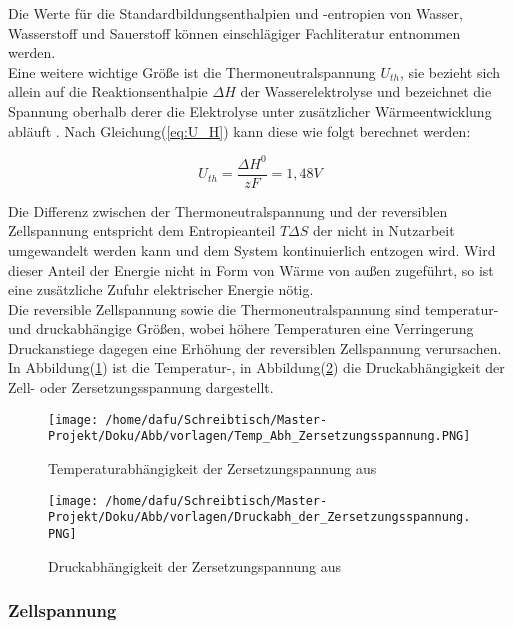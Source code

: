 \documentclass[onecolumn,10pt,titlepage]{article}
\begin{document}
	Die Werte für die Standardbildungsenthalpien und -entropien von Wasser, Wasserstoff und Sauerstoff können einschlägiger Fachliteratur entnommen werden.\\
	Eine weitere wichtige Größe ist die Thermoneutralspannung $U_{th}$, sie bezieht sich allein auf die Reaktionsenthalpie $\Delta H$ der Wasserelektrolyse und bezeichnet die Spannung oberhalb derer die Elektrolyse unter zusätzlicher Wärmeentwicklung abläuft \cite{Kurzweil.2015}. Nach Gleichung(\ref{eq:U_H}) kann diese wie folgt berechnet werden:
	
	\begin{equation}
	U_{th} = \frac{\Delta H^0}{zF} = 1,48 V
	\label{eq:U_H}
	\end{equation}
	
	Die Differenz zwischen der Thermoneutralspannung und der reversiblen Zellspannung entspricht dem Entropieanteil $T\Delta S$ der nicht in Nutzarbeit umgewandelt werden kann und dem System kontinuierlich entzogen wird. Wird dieser Anteil der Energie nicht in Form von Wärme von außen zugeführt, so ist eine zusätzliche Zufuhr elektrischer Energie nötig.\\
	Die reversible Zellspannung sowie die Thermoneutralspannung sind temperatur- und druckabhängige Größen, wobei höhere Temperaturen eine Verringerung Druckanstiege dagegen eine Erhöhung der reversiblen Zellspannung verursachen. In Abbildung(\ref{fig:Temperatur_U0}) ist die Temperatur-, in Abbildung(\ref{fig:Druck_U0}) die Druckabhängigkeit der Zell- oder Zersetzungsspannung dargestellt.\cite{Kurzweil.2015}
	
	\begin{figure}[H]
		\centering
		\texttt{[image: /home/dafu/Schreibtisch/Master-Projekt/Doku/Abb/vorlagen/Temp\_Abh\_Zersetzungsspannung.PNG]}
		\caption[Temperaturabhängigkeit der Zersetzungspannung]{Temperaturabhängigkeit der Zersetzungspannung aus \cite{Kurzweil.2015}}
		\label{fig:Temperatur_U0} 
	\end{figure}
	
	\begin{figure}[H]
		\centering
		\texttt{[image: /home/dafu/Schreibtisch/Master-Projekt/Doku/Abb/vorlagen/Druckabh\_der\_Zersetzungsspannung.PNG]}
		\caption[Druckabhängigkeit der Zersetzungspannung]{Druckabhängigkeit der Zersetzungspannung aus \cite{Kurzweil.2015}}
		\label{fig:Druck_U0} 
	\end{figure}
	
	\subsubsection{Zellspannung}
	\label{subsub_Zellspann}
	
\end{document}
